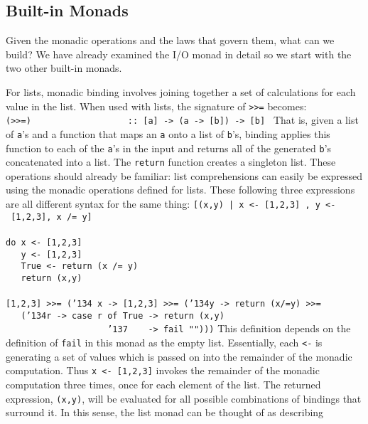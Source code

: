 \subsection{Built-in Monads}
Given the monadic operations and the laws that govern them, what can
we build?  We have already examined the I/O monad in detail so we
start with the two other built-in monads.  

For lists, monadic binding involves joining together a set of
calculations for each value in the list.  When used with lists, the
signature of \mbox{\tt >>=} becomes:
\bprog
\mbox{\tt (>>=)\ \ \ \ \ \ \ \ \ \ \ \ \ \ \ \ \ \ \ ::\ [a]\ ->\ (a\ ->\ [b])\ ->\ [b]\ }
\eprog
That is, given a list of \mbox{\tt a}'s and a function that maps an \mbox{\tt a} onto a
list of \mbox{\tt b}'s, binding applies this function to each of the \mbox{\tt a}'s in
the input and returns all of the generated \mbox{\tt b}'s concatenated into a
list.  The \mbox{\tt return} function creates a singleton list.  These
operations should already be familiar: list comprehensions can easily
be expressed using the monadic operations 
defined for lists.  These following three
expressions are all different syntax for the same thing:
\bprog
\mbox{\tt [(x,y)\ |\ x\ <-\ [1,2,3]\ ,\ y\ <-\ [1,2,3],\ x\ /=\ y]}\\
\mbox{\tt }\\[-8pt]
\mbox{\tt do\ x\ <-\ [1,2,3]}\\
\mbox{\tt \ \ \ y\ <-\ [1,2,3]}\\
\mbox{\tt \ \ \ True\ <-\ return\ (x\ /=\ y)}\\
\mbox{\tt \ \ \ return\ (x,y)}\\
\mbox{\tt }\\[-8pt]
\mbox{\tt [1,2,3]\ >>=\ ({\char'134}\ x\ ->\ [1,2,3]\ >>=\ ({\char'134}y\ ->\ return\ (x/=y)\ >>=}\\
\mbox{\tt \ \ \ ({\char'134}r\ ->\ case\ r\ of\ True\ ->\ return\ (x,y)}\\
\mbox{\tt \ \ \ \ \ \ \ \ \ \ \ \ \ \ \ \ \ \ \ \ {\char'137}\ \ \ \ ->\ fail\ "")))}
\eprog
This definition depends on the definition of \mbox{\tt fail} in this monad as
the empty list.  Essentially, each \mbox{\tt <-} is generating a set of values
which is passed on into the remainder of the monadic computation.
Thus \mbox{\tt x\ <-\ [1,2,3]} invokes the remainder of the monadic computation
three times, once for each element of the list.  The returned
expression, \mbox{\tt (x,y)}, will be
evaluated for all possible combinations of bindings that surround it.
In this sense, the list monad can be thought of as describing

